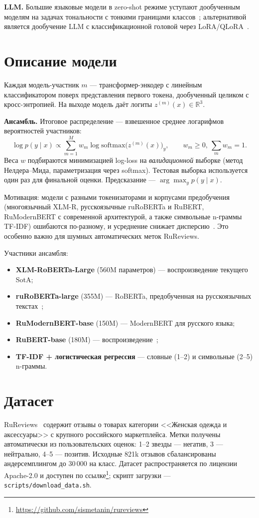 \documentclass{article}
\begin{document}
\textbf{LLM.} Большие языковые модели в zero-shot режиме уступают дообученным моделям на задачах тональности с тонкими границами классов~\cite{zhang2024sentiment}; альтернативой является дообучение LLM с классификационной головой через LoRA/QLoRA~\cite{hu2022lora,dettmers2023qlora,li2023labelsupervised}.

\section{Описание модели}
\label{sec:model}
Каждая модель-участник $m$ --- трансформер-энкодер с линейным классификатором поверх представления первого токена, дообученный целиком с кросс-энтропией. На выходе модель даёт логиты $z^{(m)}(x)\in\mathbb{R}^3$.

\textbf{Ансамбль.} Итоговое распределение --- взвешенное среднее логарифмов вероятностей участников:
$$\log p(y\mid x) \propto \sum_{m=1}^{M} w_m \log \mathrm{softmax}\big(z^{(m)}(x)\big)_y, \qquad w_m\ge 0,\ \sum_m w_m = 1.$$
Веса $w$ подбираются минимизацией log-loss на \emph{валидационной} выборке (метод Нелдера--Мида, параметризация через softmax). Тестовая выборка используется один раз для финальной оценки. Предсказание --- $\arg\max_y p(y\mid x)$.

Мотивация: модели с разными токенизаторами и корпусами предобучения (многоязычный XLM-R, русскоязычные ruRoBERTa и RuBERT, RuModernBERT с современной архитектурой, а также символьные n-граммы TF-IDF) ошибаются по-разному, и усреднение снижает дисперсию~\cite{dietterich2000ensemble}. Это особенно важно для шумных автоматических меток RuReviews.

Участники ансамбля:
\begin{itemize}
    \item \textbf{XLM-RoBERTa-Large} (560M параметров) --- воспроизведение текущего SotA;
    \item \textbf{ruRoBERTa-large} (355M) --- RoBERTa, предобученная на русскоязычных текстах~\cite{zmitrovich2023family};
    \item \textbf{RuModernBERT-base} (150M) --- ModernBERT для русского языка;
    \item \textbf{RuBERT-base} (180M) --- воспроизведение~\cite{smetanin2021deep};
    \item \textbf{TF-IDF + логистическая регрессия} --- словные (1--2) и символьные (2--5) n-граммы.
\end{itemize}

\section{Датасет}
RuReviews~\cite{smetanin2019rureviews} содержит отзывы о товарах категории <<Женская одежда и аксессуары>> с крупного российского маркетплейса. Метки получены автоматически из пользовательских оценок: 1--2 звезды --- негатив, 3 --- нейтрально, 4--5 --- позитив. Исходные 821k отзывов сбалансированы андерсемплингом до 30\,000 на класс. Датасет распространяется по лицензии Apache-2.0 и доступен по ссылке\footnote{\url{https://github.com/sismetanin/rureviews}}; скрипт загрузки --- \texttt{scripts/download\_data.sh}.
\end{document}
